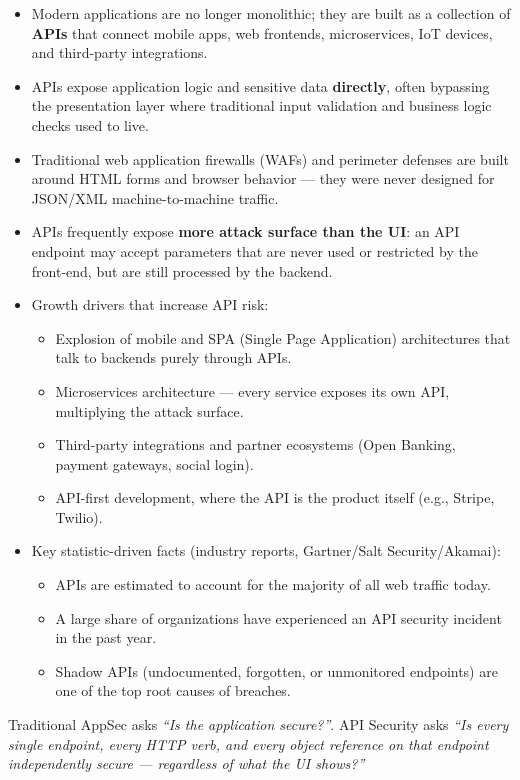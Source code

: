 \documentclass[11pt]{article}
\begin{document}
\begin{itemize}
  \item Modern applications are no longer monolithic; they are built as a collection of \textbf{APIs} that connect mobile apps, web frontends, microservices, IoT devices, and third-party integrations.
  \item APIs expose application logic and sensitive data \textbf{directly}, often bypassing the presentation layer where traditional input validation and business logic checks used to live.
  \item Traditional web application firewalls (WAFs) and perimeter defenses are built around HTML forms and browser behavior --- they were never designed for JSON/XML machine-to-machine traffic.
  \item APIs frequently expose \textbf{more attack surface than the UI}: an API endpoint may accept parameters that are never used or restricted by the front-end, but are still processed by the backend.
  \item Growth drivers that increase API risk:
  \begin{itemize}
    \item Explosion of mobile and SPA (Single Page Application) architectures that talk to backends purely through APIs.
    \item Microservices architecture --- every service exposes its own API, multiplying the attack surface.
    \item Third-party integrations and partner ecosystems (Open Banking, payment gateways, social login).
    \item API-first development, where the API is the product itself (e.g., Stripe, Twilio).
  \end{itemize}
  \item Key statistic-driven facts (industry reports, Gartner/Salt Security/Akamai):
  \begin{itemize}
    \item APIs are estimated to account for the majority of all web traffic today.
    \item A large share of organizations have experienced an API security incident in the past year.
    \item Shadow APIs (undocumented, forgotten, or unmonitored endpoints) are one of the top root causes of breaches.
  \end{itemize}
\end{itemize}

\begin{notebox}
Traditional AppSec asks \textit{``Is the application secure?''}. API Security asks \textit{``Is every single endpoint, every HTTP verb, and every object reference on that endpoint independently secure --- regardless of what the UI shows?''}
\end{notebox}
\end{document}
